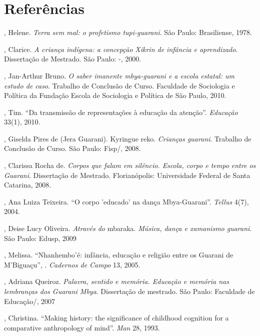 \section{Referências}

\begin{Parskip}
, Helene. \emph{Terra sem mal: o profetismo tupi-guarani}. São
Paulo: Brasiliense, 1978.

, Clarice. \emph{A criança indígena: a concepção Xikrin de infância
e aprendizado}. Dissertação de Mestrado. São Paulo: -, 2000.

, Jan-Arthur Bruno. \emph{O saber imanente mbya-guarani e a escola
estatal: um estudo de caso}. Trabalho de Conclusão de Curso. Faculdade
de Sociologia e Política da Fundação Escola de Sociologia e Política de
São Paulo, 2010.

, Tim. ``Da transmissão de representações à educação da
atenção''. \emph{Educação} 33(1), 2010.

, Giselda Pires de (Jera Guarani). Kyringue reko. \emph{Crianças
guarani}. Trabalho de Conclusão de Curso. São Paulo: Fisp/, 2008.

, Clarissa Rocha de. \emph{Corpos que falam em silêncio. Escola,
corpo e tempo entre os Guarani}.  Dissertação de Mestrado.
Florianópolis: Universidade Federal de Santa Catarina, 2008.

, Ana Luiza Teixeira. ``O corpo 'educado' na dança
Mbya-Guarani''. \emph{Tellus} 4(7), 2004.

, Deise Lucy Oliveira. \emph{Através do} mbaraka. \emph{Música, dança e
xamanismo guarani}. São Paulo: Edusp, 2009

, Melissa. ``Nhanhembo’é: infância, educação e religião
entre os Guarani de M’Biguaçu'', . \emph{Cadernos de Campo} 13, 2005.

, Adriana Queiroz. \emph{Palavra, sentido e memória. Educação e
memória nas lembranças dos Guarani Mbya}. Dissertação de mestrado. São
Paulo: Faculdade de Educação/, 2007

, Christina. ``Making history: the significance of childhood
cognition for a comparative anthropology of mind''. \emph{Man} 28, 1993.
\end{Parskip}

